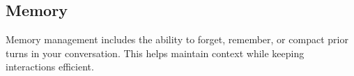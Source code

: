 \subsection*{Memory}

Memory management includes the ability to forget, remember, or compact prior turns in your conversation. This helps maintain context while keeping interactions efficient.